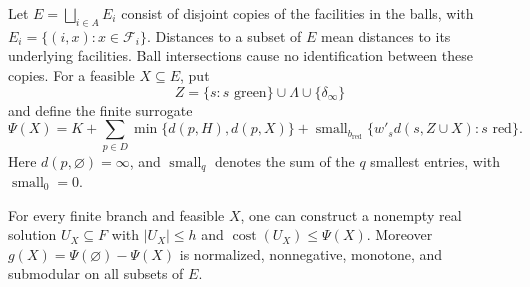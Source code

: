 Let $E=\bigsqcup_{i\in A}E_i$ consist of disjoint copies of the
facilities in the balls, with $E_i=\{(i,x):x\in\mathcal F_i\}$.
Distances to a subset of $E$ mean distances to its underlying facilities.
Ball intersections cause no identification between these copies.
For a feasible $X\subseteq E$, put
\[
 Z=\{s:s\text{ green}\}\cup\Lambda\cup\{\delta_\infty\}
\]
and define the finite surrogate
\begin{equation}
 \Psi(X)=K+\sum_{p\in D}\min\{d(p,H),d(p,X)\}
  +\operatorname{small}_{b_{\mathrm{red}}}
       \{w'_s d(s,Z\cup X):s\text{ red}\}.
 \label{comp:surrogate}
\end{equation}
Here $d(p,\varnothing)=\infty$, and $\operatorname{small}_q$ denotes
the sum of the $q$ smallest entries, with $\operatorname{small}_0=0$.

\begin{lemma}
\label{comp:surrogate-properties}
For every finite branch and feasible $X$, one can construct a nonempty
real solution $U_X\subseteq F$ with $|U_X|\le h$ and
$\operatorname{cost}(U_X)\le\Psi(X)$.  Moreover
$g(X)=\Psi(\varnothing)-\Psi(X)$ is normalized, nonnegative, monotone,
and submodular on all subsets of $E$.
\end{lemma}


